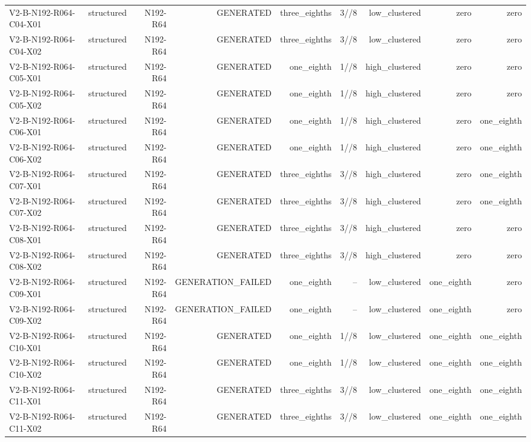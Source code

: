 {\begin{longtable}{lrrrrrrrr}
V2-B-N192-R064-C04-X01 & structured & N192-R64 & GENERATED & three\_eighths & 3//8 & low\_clustered & zero & zero \\
V2-B-N192-R064-C04-X02 & structured & N192-R64 & GENERATED & three\_eighths & 3//8 & low\_clustered & zero & zero \\
V2-B-N192-R064-C05-X01 & structured & N192-R64 & GENERATED & one\_eighth & 1//8 & high\_clustered & zero & zero \\
V2-B-N192-R064-C05-X02 & structured & N192-R64 & GENERATED & one\_eighth & 1//8 & high\_clustered & zero & zero \\
V2-B-N192-R064-C06-X01 & structured & N192-R64 & GENERATED & one\_eighth & 1//8 & high\_clustered & zero & one\_eighth \\
V2-B-N192-R064-C06-X02 & structured & N192-R64 & GENERATED & one\_eighth & 1//8 & high\_clustered & zero & one\_eighth \\
V2-B-N192-R064-C07-X01 & structured & N192-R64 & GENERATED & three\_eighths & 3//8 & high\_clustered & zero & one\_eighth \\
V2-B-N192-R064-C07-X02 & structured & N192-R64 & GENERATED & three\_eighths & 3//8 & high\_clustered & zero & one\_eighth \\
V2-B-N192-R064-C08-X01 & structured & N192-R64 & GENERATED & three\_eighths & 3//8 & high\_clustered & zero & zero \\
V2-B-N192-R064-C08-X02 & structured & N192-R64 & GENERATED & three\_eighths & 3//8 & high\_clustered & zero & zero \\
V2-B-N192-R064-C09-X01 & structured & N192-R64 & GENERATION\_FAILED & one\_eighth & -- & low\_clustered & one\_eighth & zero \\
V2-B-N192-R064-C09-X02 & structured & N192-R64 & GENERATION\_FAILED & one\_eighth & -- & low\_clustered & one\_eighth & zero \\
V2-B-N192-R064-C10-X01 & structured & N192-R64 & GENERATED & one\_eighth & 1//8 & low\_clustered & one\_eighth & one\_eighth \\
V2-B-N192-R064-C10-X02 & structured & N192-R64 & GENERATED & one\_eighth & 1//8 & low\_clustered & one\_eighth & one\_eighth \\
V2-B-N192-R064-C11-X01 & structured & N192-R64 & GENERATED & three\_eighths & 3//8 & low\_clustered & one\_eighth & one\_eighth \\
V2-B-N192-R064-C11-X02 & structured & N192-R64 & GENERATED & three\_eighths & 3//8 & low\_clustered & one\_eighth & one\_eighth \\

\end{longtable}}

